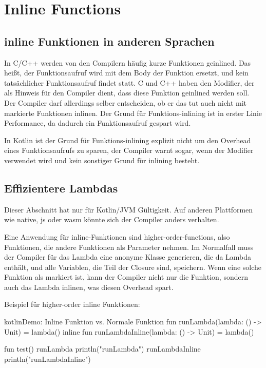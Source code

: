 
\section{Inline Functions}\label{sec:inline-functions}

\renewcommand{\kapitelautor}{Autor: Marvin Kurka}

\subsection{inline Funktionen in anderen Sprachen}
In C/C++ werden von den Compilern häufig kurze Funktionen geinlined.
Das heißt, der Funktionsaufruf wird mit dem Body der Funktion ersetzt, und kein tatsächlicher
Funktionsaufruf findet statt.
C und C++ haben den  Modifier, der als Hinweis für den Compiler dient, dass diese Funktion
geinlined werden soll.
Der Compiler darf allerdings selber entscheiden, ob er das tut \bzw auch nicht mit  markierte
Funktionen inlinen.
Der Grund für Funktions-inlining ist in erster Linie Performance, da dadurch ein Funktionsaufruf gespart wird.

In Kotlin ist der Grund für Funktions-inlining explizit nicht um den Overhead eines Funktionsaufrufs zu sparen,
der Compiler warnt sogar, wenn der  Modifier verwendet wird und kein sonstiger Grund für
inlining besteht.

\subsection{Effizientere Lambdas}
Dieser Abschnitt hat nur für Kotlin/JVM Gültigkeit.
Auf anderen Plattformen wie native, js oder wasm könnte sich der Compiler anders verhalten.

Eine Anwendung für inline-Funktionen sind higher-order-functions, also Funktionen, die andere Funktionen als Parameter
nehmen.
Im Normalfall muss der Compiler für das Lambda eine anonyme Klasse generieren, die da Lambda enthält, und alle Variablen,
die Teil der Closure sind, speichern.
Wenn eine solche Funktion als  markiert ist, kann der Compiler nicht nur die Funktion, sondern auch
das Lambda inlinen, was diesen Overhead spart.

Beispiel für higher-order inline Funktionen:

\begin{codeBlock}{kotlin}{Demo: Inline Funktion vs. Normale Funktion}
fun runLambda(lambda: () -> Unit) = lambda()
inline fun runLambdaInline(lambda: () -> Unit) = lambda()

fun test() {
    runLambda {
        println("runLambda")
    }
    runLambdaInline {
        println("runLambdaInline")
    }
}
\end{codeBlock}

